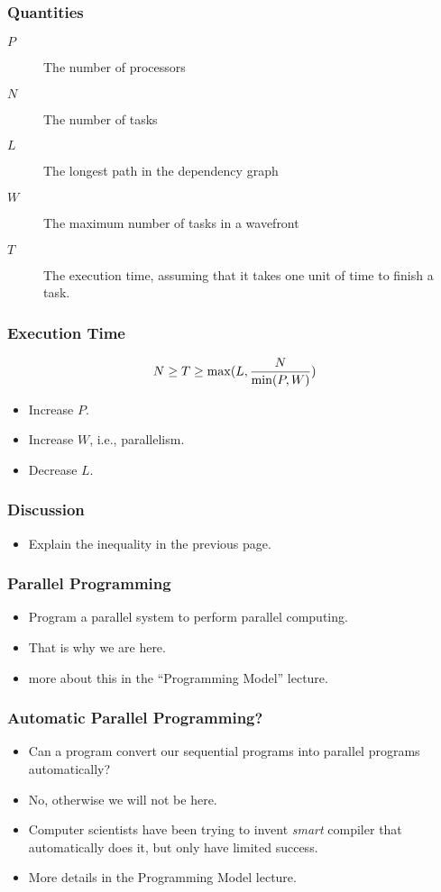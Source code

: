 \documentclass{beamer}
\begin{document}
\begin{CJK}{UTF8}{bsmi}
  \begin{frame}
    \frametitle{Quantities} 
    \begin{description}
    \item [$P$] The number of processors
    \item [$N$] The number of tasks 
    \item [$L$] The longest path in the dependency graph
    \item [$W$] The maximum number of tasks in a wavefront
    \item [$T$] The execution time, assuming that it takes one unit of
      time to finish a task.
    \end{description}
  \end{frame}

  \begin{frame}
    \frametitle{Execution Time} 
    \begin{equation}
      N \geq T \ge \max(L, {N \over {\min(P, W)}})
    \end{equation}
    \begin{itemize}
    \item Increase $P$.
    \item Increase $W$, i.e., parallelism.
    \item Decrease $L$.
    \end{itemize}
  \end{frame}

  \begin{frame}
    \frametitle{Discussion} 
    \begin{itemize}
    \item Explain the inequality in the previous page.
    \end{itemize}
  \end{frame}

  \begin{frame}
    \frametitle{Parallel Programming} 
    \begin{itemize}
    \item Program a parallel system to perform parallel computing.
    \item That is why we are here.
    \item more about this in the ``Programming Model'' lecture.
    \end{itemize}
  \end{frame}

  \begin{frame}
    \frametitle{Automatic Parallel Programming?} 
    \begin{itemize}
    \item Can a program convert our sequential programs into parallel
      programs automatically?
    \item No, otherwise we will not be here.
    \item Computer scientists have been trying to invent {\em smart} compiler that automatically does it, but only have limited success.
    \item More details in the Programming Model lecture.
    \end{itemize}
  \end{frame}


\end{CJK}
\end{document}

